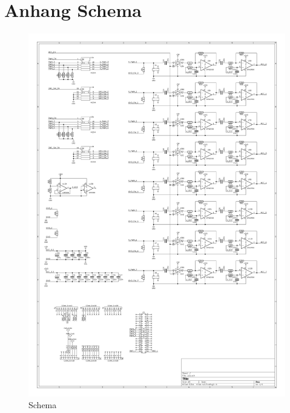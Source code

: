 \section{Anhang Schema}\label{sec:appendix_schema}

\begin{figure}[htb]
\begin{center}
\includegraphics[width=\textwidth]{graphics/image_appendix_schematic.png}
\end{center}
\caption{Schema} %
\label{fig:image_print_output_schematic_overview}
\end{figure}
%
\clearpage

